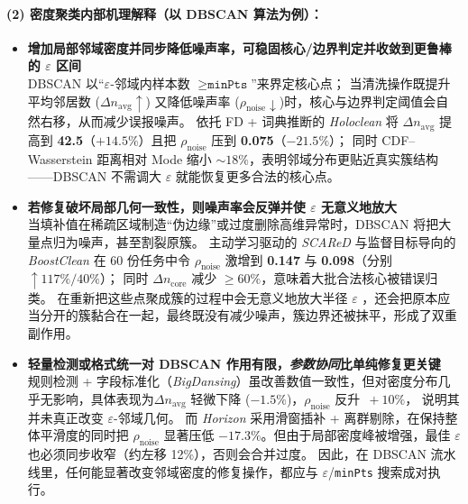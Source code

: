 \documentclass[10pt]{article} %
\numberwithin{equation}{section}
\begin{document}
\paragraph{(2) 密度聚类内部机理解释（以 DBSCAN 算法为例）：}
\label{sec:density_by_conclusion}
\vspace{-0.25em}

\begin{itemize}[leftmargin=1.6em,itemsep=4pt]

  \item \textbf{增加局部邻域密度并同步降低噪声率，可稳固核心/边界判定并收敛到更鲁棒的 $\varepsilon$ 区间} \\  
        DBSCAN 以“$\varepsilon$‐邻域内样本数 $\ge\texttt{minPts}$”来界定核心点；  
        \textcolor[rgb]{0.00,0.07,1.00}{当清洗操作既提升平均邻居数 (\(\Delta n_{\text{avg}}\!\uparrow\)) 又降低噪声率 (\(\rho_{\text{noise}}\!\downarrow\))时，核心与边界判定阈值会自然右移，从而减少误报噪声。}
        依托 FD + 词典推断的 \textit{Holoclean} 将 \(\Delta n_{\text{avg}}\) 提高到 \textbf{42.5}（\(+14.5\%\)）且把 $\rho_{\text{noise}}$ 压到 \textbf{0.075}（\(-21.5\%\)）；  
        同时 CDF–Wasserstein 距离相对 Mode 缩小 \(\sim18\%\)，\textcolor[rgb]{0.00,0.07,1.00}{表明邻域分布更贴近真实簇结构——DBSCAN 不需调大 $\varepsilon$ 就能恢复更多合法的核心点。}

  \item \textbf{若修复破坏局部几何一致性，则噪声率会反弹并使 $\varepsilon$ 无意义地放大} \\  
        \textcolor[rgb]{0.00,0.07,1.00}{当填补值在稀疏区域制造“伪边缘”或过度删除高维异常时，DBSCAN 将把大量点归为噪声，甚至割裂原簇。 }
        主动学习驱动的 \textit{SCAReD} 与监督目标导向的 \textit{BoostClean} 在 60 份任务中令 $\rho_{\text{noise}}$ 激增到 \textbf{0.147} 与 \textbf{0.098}（分别 \(\uparrow117\%\!\!/\!40\%\)）；  
        同时 \(\Delta n_{\text{core}}\) 减少 \(\ge60\%\)，意味着大批合法核心被错误归类。  
        \textcolor[rgb]{0.00,0.07,1.00}{在重新把这些点聚成簇的过程中会无意义地放大半径 $\varepsilon$ ，还会把原本应当分开的簇黏合在一起，最终既没有减少噪声，簇边界还被抹平，形成了双重副作用。}

  \item \textbf{轻量检测或格式统一对 DBSCAN 作用有限，\emph{参数协同}比单纯修复更关键} \\  
        规则检测 + 字段标准化（\textit{BigDansing}）虽改善数值一致性，但对密度分布几乎无影响，具体表现为\(\Delta n_{\text{avg}}\) 轻微下降 (\(-1.5\%\))，$\rho_{\text{noise}}$ 反升 \(\,+10\%\)，  
        说明其并未真正改变 \(\varepsilon\)-邻域几何。
      而 \emph{Horizon} 采用滑窗插补 + 离群剔除，在保持整体平滑度的同时把 \(\rho_{\text{noise}}\) 显著压低 \(-17.3\%\)。但由于局部密度峰被增强，最佳 \(\varepsilon\) 也必须同步收窄（约左移 12\%），否则会合并过度。 \textcolor[rgb]{0.00,0.07,1.00}{因此，在 DBSCAN 流水线里，任何能显著改变邻域密度的修复操作，都应与 \(\varepsilon\)/\texttt{minPts} 搜索成对执行。}

\end{itemize}
\end{document}
